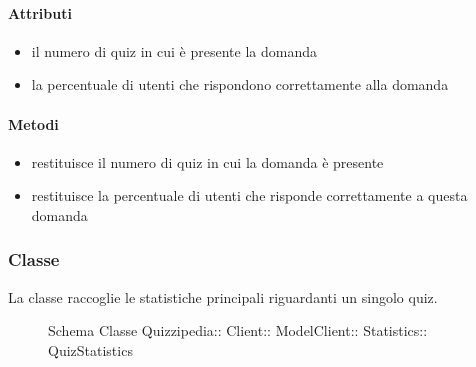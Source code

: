 \paragraph{Attributi}
\begin{itemize}
\item {}
\newline
il numero di quiz in cui è presente la domanda
\item {}
\newline
la percentuale di utenti che rispondono correttamente alla domanda
\end{itemize}
\paragraph{Metodi}
\begin{itemize}
\item {}
\newline
restituisce il numero di quiz in cui la domanda è presente
\newline
\item {}
\newline
restituisce la percentuale di utenti che risponde correttamente a questa domanda
\newline
\end{itemize}
\subsubsection{Classe }
La classe raccoglie le statistiche principali riguardanti un singolo quiz.
\begin{figure}[H]
\centering
\noindent{}
\caption[Schema Classe QuizStatistics]{Schema Classe Quizzipedia:: Client:: ModelClient:: Statistics:: QuizStatistics}
\end{figure}
